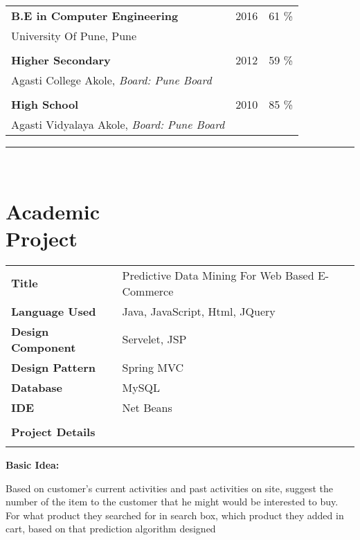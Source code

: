 \documentclass[letterpaper,margin,line]{RES}
\def\mmmyline{\rule{\textwidth}{1pt}\\}
\begin{document}
\begin{resume}
\begin{tabular}{@{}p{4in}p{.75in}p{.75in}}
{\bf B.E in Computer Engineering }          &  2016 &  61 \%     \\
University Of Pune, Pune                                &       & \\ \hline \\ 
{\bf Higher Secondary }                                 &  2012 &  59 \%   \\       
Agasti College Akole, \it Board: Pune Board        &       &       
\\ \hline     \\
{\bf High School }                                      &  2010 &  85 \%   \\    
Agasti Vidyalaya Akole, \it Board: Pune Board                       &       &            \\
\end{tabular}

\mmmyline
{ \bf 	
\section{\sc Academic \\Project }
\vspace{.04in}}

\begin{tabular}{@{}p{2in}p{4in}}
{\bf Title}                             & Predictive Data Mining For Web Based E-Commerce \\
{\bf Language Used}                                 & Java, JavaScript, Html, JQuery \\
{\bf Design Component}                       & Servelet, JSP \\
{\bf Design Pattern}                     & Spring MVC \\
{\bf Database}                   & MySQL \\
{\bf IDE}                     & Net Beans  \\
\\

{\bf Project Details} \\
\hline \\

\end{tabular}
{\bf Basic Idea:}

Based on customer’s current activities and past activities on site, suggest the number of the item to the customer that he might would be interested to buy. For what product they searched for in search box, which product they added in cart, based on that prediction algorithm designed
\\


\end{resume}
\end{document}

